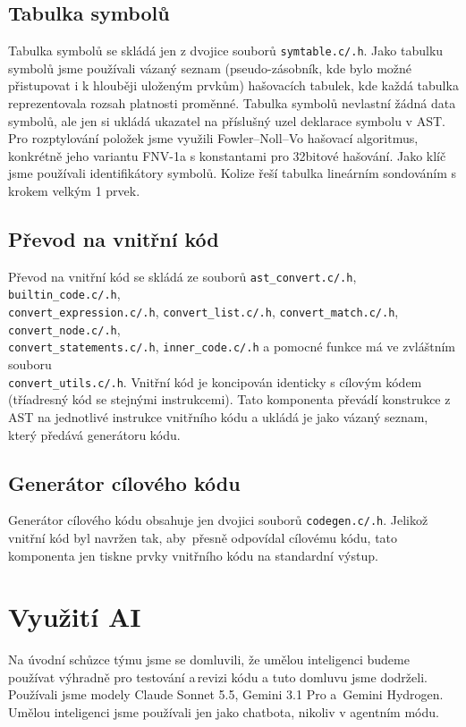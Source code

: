 \documentclass{article}
\begin{document}
        \subsection{Tabulka symbolů}
            Tabulka symbolů se skládá jen z dvojice souborů \verb|symtable.c/.h|. Jako tabulku symbolů jsme používali vázaný seznam (pseudo-zásobník, kde bylo možné přistupovat i k hlouběji uloženým prvkům) hašovacích tabulek, kde každá tabulka reprezentovala rozsah platnosti proměnné. Tabulka symbolů nevlastní žádná data symbolů, ale jen si ukládá ukazatel na příslušný uzel deklarace symbolu v AST. Pro rozptylování položek jsme využili Fowler–Noll–Vo hašovací algoritmus, konkrétně jeho variantu FNV-1a \cite{FNV-1a} s konstantami pro 32bitové hašování. Jako klíč jsme používali identifikátory symbolů. Kolize řeší tabulka lineárním sondováním s krokem velkým 1 prvek.
        \subsection{Převod na vnitřní kód}
            Převod na vnitřní kód se skládá ze souborů \verb|ast_convert.c/.h|, \verb|builtin_code.c/.h|,\\
            \verb|convert_expression.c/.h|, \verb|convert_list.c/.h|, \verb|convert_match.c/.h|, \verb|convert_node.c/.h|,\\ 
            \verb|convert_statements.c/.h|, \verb|inner_code.c/.h| a pomocné funkce má ve zvláštním souboru\\
            \verb|convert_utils.c/.h|. 
            Vnitřní kód je koncipován identicky s cílovým kódem (tříadresný kód se stejnými instrukcemi). Tato komponenta převádí konstrukce z AST na jednotlivé instrukce vnitřního kódu a ukládá je jako vázaný seznam, který předává generátoru kódu.
            
        \subsection{Generátor cílového kódu}
            Generátor cílového kódu obsahuje jen dvojici souborů \verb|codegen.c/.h|. Jelikož vnitřní kód byl navržen tak, aby~přesně odpovídal cílovému kódu, tato komponenta jen tiskne prvky vnitřního kódu na standardní výstup. 
            


    \newpage


    \section{Využití AI}
        Na úvodní schůzce týmu jsme se domluvili, že umělou inteligenci budeme používat výhradně pro testování a\,revizi kódu a tuto domluvu jsme dodrželi. Používali jsme modely Claude Sonnet 5.5, Gemini 3.1 Pro  a~Gemini Hydrogen. Umělou inteligenci jsme používali jen jako chatbota, nikoliv v agentním módu.
\end{document}
